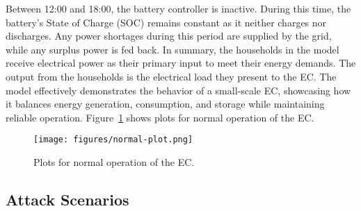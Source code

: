 Between 12:00 and 18:00, the battery controller is inactive. During this time, the battery’s State of Charge (SOC) remains constant as it neither charges nor discharges. Any power shortages during this period are supplied by the grid, while any surplus power is fed back. In summary, the households in the model receive electrical power as their primary input to meet their energy demands. The output from the households is the electrical load they present to the EC. The model effectively demonstrates the behavior of a small-scale EC, showcasing how it balances energy generation, consumption, and storage while maintaining reliable operation. Figure~\ref{fig:ec-plot} shows plots for normal operation of the EC. 

\begin{figure}[htbp!] 
    \centering 
    \texttt{[image: figures/normal-plot.png]}
    \caption{Plots for normal operation of the EC.}
    \centering
    \label{fig:ec-plot}
\end{figure}

    
\subsection{Attack Scenarios}

